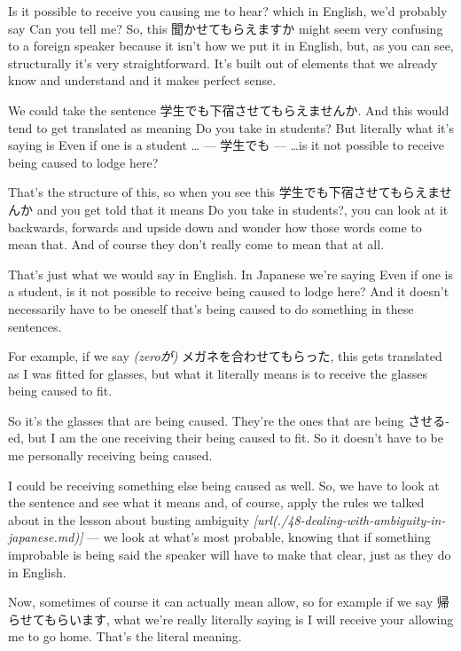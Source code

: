{}

Is it possible to receive you causing me to hear? which in English, we'd probably say Can you tell me? So, this 聞かせてもらえますか might seem very confusing to a foreign speaker because it isn't how we put it in English, but, as you can see, structurally it's very straightforward. It's built out of elements that we already know and understand and it makes perfect sense.

We could take the sentence 学生でも下宿させてもらえませんか. And this would tend to get translated as meaning Do you take in students? But literally what it's saying is Even if one is a student \ldots{} --- 学生でも --- \ldots{}is it not possible to receive being caused to lodge here?

{}

That's the structure of this, so when you see this 学生でも下宿させてもらえませんか and you get told that it means Do you take in students?, you can look at it backwards, forwards and upside down and wonder how those words come to mean that. And of course they don't really come to mean that at all.

That's just what we would say in English. In Japanese we're saying Even if one is a student, is it not possible to receive being caused to lodge here? And it doesn't necessarily have to be oneself that's being caused to do something in these sentences.

For example, if we say {\em (zeroが)} メガネを合わせてもらった, this gets translated as I was fitted for glasses, but what it literally means is to receive the glasses being caused to fit.

{}

So it's the glasses that are being caused. They're the ones that are being させる-ed, but I am the one receiving their being caused to fit. So it doesn't have to be me personally receiving being caused.

I could be receiving something else being caused as well. So, we have to look at the sentence and see what it means and, of course, apply the rules we talked about in the lesson about busting ambiguity {\em \goto{{[}48{]}}[url(./48-dealing-with-ambiguity-in-japanese.md)]} --- we look at what's most probable, knowing that if something improbable is being said the speaker will have to make that clear, just as they do in English.

Now, sometimes of course it can actually mean allow, so for example if we say 帰らせてもらいます, what we're really literally saying is I will receive your allowing me to go home. That's the literal meaning.

